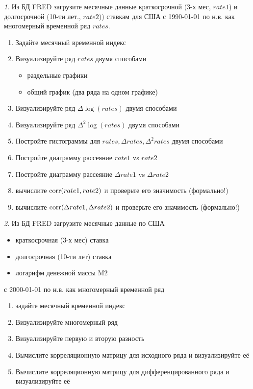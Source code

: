 \documentclass[12pt]{article}
\theoremstyle{remark}
\newtheorem{exercise}{}[subsection]
\begin{document}
\begin{exercise}
Из БД FRED загрузите месячные данные краткосрочной (3-х мес, \(rate1\)) и долгосрочной (10-ти лет., \(rate2\)))
ставкам для США с 1990-01-01 по н.в. как многомерный временной ряд \(rates\).
\begin{enumerate}
	\item Задайте месячный временной индекс
	\item Визуализируйте ряд \(rates\) двумя способами
	\begin{itemize}
		\item раздельные графики
		\item общий график (два ряда на одном графике)
	\end{itemize}
	\item Визуализируйте ряд \(\Delta\log(rates)\) двумя способами
	\item Визуализируйте ряд \(\Delta^2\log(rates)\) двумя способами
	\item Постройте гистограммы для \(rates,\Delta rates,\Delta^2 rates\) двумя способами
	\item Постройте диаграмму рассеяние \(rate1\) vs \(rate2\)
	\item Постройте диаграмму рассеяние \(\Delta rate1 \) vs \(\Delta rate2\)
	\item вычислите \(\operatorname{corr}(rate1, rate2)\) и 
	проверьте его значимость (формально!)
	\item вычислите \(\operatorname{corr}(\Delta rate1, \Delta rate2)\) и 
	проверьте его значимость (формально!)
\end{enumerate}
\end{exercise}

\begin{exercise}
Из БД FRED загрузите месячные данные по США
\begin{itemize}
	\item краткосрочная (3-х мес) ставка
	\item долгосрочная (10-ти лет) ставка
	\item логарифм денежной массы M2
\end{itemize}
с 2000-01-01 по н.в. как многомерный временной ряд
\begin{enumerate}
	\item задайте месячный временной индекс
	\item Визуализируйте многомерный ряд
	\item Визуализируйте первую и вторую разность
	\item Вычислите корреляционную матрицу для исходного ряда и визуализируйте её
	\item Вычислите корреляционную матрицу для дифференцированного ряда и визуализируйте её
\end{enumerate}
\end{exercise}
\end{document}
